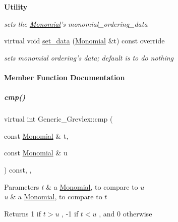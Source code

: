 \begin{Indent}\textbf{ Utility}\par
{\em sets the \hyperlink{group__polygroup_class_monomial}{Monomial}'s {\ttfamily monomial\+\_\+ordering\+\_\+data} }\begin{DoxyCompactItemize}
\item 
virtual void \hyperlink{group__orderinggroup_a14c344858da03d16c8019afdae3da5dc}{set\+\_\+data} (\hyperlink{group__polygroup_class_monomial}{Monomial} \&t) const override
\begin{DoxyCompactList}\small\item\em sets monomial ordering's data; default is to do nothing \end{DoxyCompactList}\end{DoxyCompactItemize}
\end{Indent}


\paragraph{Member Function Documentation}
\mbox{\label{group__orderinggroup_ae7103c92d45f749eaf3c5403b17a2828}} 
\subparagraph{\texorpdfstring{cmp()}{cmp()}}
{\footnotesize\ttfamily virtual int Generic\+\_\+\+Grevlex\+::cmp (\begin{DoxyParamCaption}\item[{const \hyperlink{group__polygroup_class_monomial}{Monomial} \&}]{t,  }\item[{const \hyperlink{group__polygroup_class_monomial}{Monomial} \&}]{u }\end{DoxyParamCaption}) const\hspace{0.3cm}{\ttfamily [inline]}, {\ttfamily [override]}, {\ttfamily [virtual]}}


\begin{DoxyParams}{Parameters}
{\em t} & a \hyperlink{group__polygroup_class_monomial}{Monomial}, to compare to $ u $ \\
\hline
{\em u} & a \hyperlink{group__polygroup_class_monomial}{Monomial}, to compare to $ t $ \\
\hline
\end{DoxyParams}
\begin{DoxyReturn}{Returns}
1 if $ t > u $ , -\/1 if $ t < u $ , and 0 otherwise 
\end{DoxyReturn}


